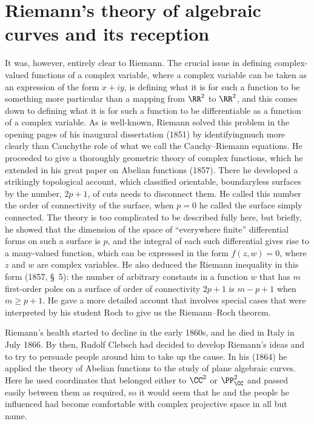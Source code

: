 \section{Riemann's theory of algebraic curves and its reception}
It was, however, entirely clear to Riemann. The crucial issue in defining complex-valued functions of a complex variable, where a complex variable can be taken as an expression of the form $x+ iy$, is defining what it is for such a function to be something more particular than a mapping from $\RR^2$ to $\RR^2$, and this comes down to defining what it is for such a function to be differentiable as a function of a complex variable. As is well-known, Riemann solved this problem in the opening pages of his inaugural dissertation  (1851) by identifying\emdash much more clearly than Cauchy\emdash the role of what we call the Cauchy--Riemann equations. He proceeded to give a thoroughly geometric theory of complex functions, which he extended in his great paper on Abelian functions (1857). There he developed a strikingly topological account, which classified orientable, boundaryless surfaces by the number, $2p+1$, of cuts needs to disconnect them. He called this number the order of connectivity of the surface, when $p=0$ he called the surface simply connected. The theory is too complicated to be described fully here, but briefly, he showed that  the dimension of the space of ``everywhere finite'' differential forms on such a surface is $p$, and the integral of each such 
differential gives rise to a many-valued function, which can be expressed in the form $f(z, w) = 0$, where $z$ and $w$ are complex variables. He also deduced the Riemann inequality in this form (1857, \S\, 5):  the number of arbitrary constants in a function $w$ that has $m$ first-order poles on a surface of order of connectivity $2p+1$ is $m- p + 1$ when $m \geq p + 1$. He gave a more detailed account that involves special cases that were interpreted by his student Roch to give us the Riemann--Roch theorem. 

Riemann's health started to decline in the early 1860s, and he  died in Italy in July 1866. By then, Rudolf Clebsch had decided to develop Riemann's ideas and to try to persuade people around him to take up the cause. In his (1864) he  applied the theory of Abelian functions to the study of plane algebraic curves. Here he used coordinates that belonged  either to $\CC^2$ or $\PP_{\CC}^2$ and  passed easily between them as required, so it would seem that he and the people he influenced had become comfortable with complex projective space in all but name.

